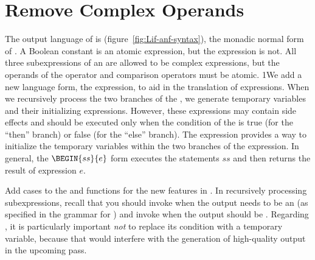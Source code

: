 \documentclass[7x10]{TimesAPriori_MIT}%
\def\pythonEd{1}
\def\edition{1}
\newcommand{\pythonColor}[0]{}
\newcommand{\python}[1]{{\if\edition\pythonEd\pythonColor #1\fi}}
\numberwithin{theorem}{chapter}
\numberwithin{definition}{chapter}
\numberwithin{equation}{chapter}
\begin{document}
\section{Remove Complex Operands}
\label{sec:remove-complex-opera-Lif}

The output language of  is
\LangIfANF{} (figure~\ref{fig:Lif-anf-syntax}), the monadic
normal form of \LangIf{}.  A Boolean constant is an atomic expression,
but the  expression is not.  All three subexpressions of an
 are allowed to be complex expressions, but the operands of
the  operator and comparison operators must be atomic.
%
\python{We add a new language form, the  expression, to aid
  in the translation of \code{if} expressions. When we recursively
  process the two branches of the \code{if}, we generate temporary
  variables and their initializing expressions. However, these
  expressions may contain side effects and should be executed only
  when the condition of the \code{if} is true (for the ``then''
  branch) or false (for the ``else'' branch). The \code{Begin} expression
  provides a way to initialize the temporary variables within the two branches
  of the \code{if} expression.  In general, the $\BEGIN{ss}{e}$
  form executes the statements $ss$ and then returns the result of
  expression $e$.}

Add cases to the  and  functions for
the new features in \LangIf{}. In recursively processing
subexpressions, recall that you should invoke  when
the output needs to be an \Atm{} (as specified in the grammar for
\LangIfANF{}) and invoke  when the output should be
\Exp{}.  Regarding , it is particularly important 
\emph{not} to replace its condition with a temporary variable, because
that would interfere with the generation of high-quality output in the
upcoming  pass.

\newcommand{\LifMonadASTRacket}{
\begin{array}{rcl}
\Atm &::=& \BOOL{\itm{bool}}\\
\Exp &::=& \UNIOP{\key{not}}{\Atm} 
     \MID \BINOP{\itm{cmp}}{\Atm}{\Atm} 
     \MID \IF{\Exp}{\Exp}{\Exp} 
\end{array}
}
  
\newcommand{\LifMonadASTPython}{
\begin{array}{rcl}
\Atm &::=& \BOOL{\itm{bool}}\\
\Exp &::=& \UNIOP{\key{Not()}}{\Exp}
           \MID \CMP{\Atm}{\itm{cmp}}{\Atm} \\
   &\MID& \IF{\Exp}{\Exp}{\Exp} 
    \MID \BEGIN{\Stmt^{*}}{\Exp}\\
\Stmt{} &::=& \IFSTMT{\Exp}{\Stmt^{*}}{\Stmt^{*}}
\end{array}
}
\end{document}
